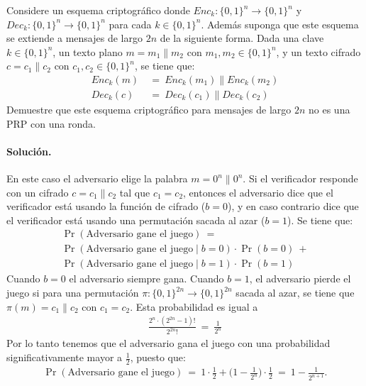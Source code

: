 Considere un esquema criptográfico donde $\textit{Enc}_k : \{0,1\}^n \to \{0,1\}^n$ y $\textit{Dec}_k :\{0,1\}^n \to \{0,1\}^n$ para cada $k \in \{0,1\}^n$. Además suponga que este esquema se extiende a mensajes de largo $2n$ de la siguiente forma. Dada una clave $k \in \{0,1\}^n$, un texto plano $m = m_1 \| m_2$ con $m_1, m_2 \in \{0,1\}^n$, y un texto cifrado $c = c_1 \| c_2$ con $c_1, c_2 \in \{0,1\}^n$, se tiene que:
\begin{align*}
\textit{Enc}_k(m) \ &= \ \textit{Enc}_k(m_1) \| \textit{Enc}_k(m_2)\\
\textit{Dec}_k(c) \ &= \ \textit{Dec}_k(c_1) \| \textit{Dec}_k(c_2)
\end{align*}
Demuestre que este esquema criptográfico para mensajes de largo $2n$ no es una PRP con una ronda.

\paragraph{Solución.} En este caso el adversario elige la palabra $m = 0^n \| 0^n$. Si el verificador responde con un cifrado $c = c_1 \| c_2$ tal que $c_1 = c_2$, entonces el adversario dice que el verificador está usando la función de cifrado ($b=0$), y en caso contrario dice que el verificador está usando una permutación sacada al azar ($b=1$).
Se tiene que:
\begin{multline*}
\Pr(\text{Adversario gane el juego}) \ =\\ 
\Pr(\text{Adversario gane el juego} \mid b=0) \cdot \Pr(b=0) \ +\\
\Pr(\text{Adversario gane el juego} \mid b=1) \cdot \Pr(b=1)
\end{multline*}
Cuando $b = 0$ el adversario siempre gana. Cuando $b = 1$, el adversario pierde el juego si para una permutación $\pi : \{0,1\}^{2n} \to \{0,1\}^{2n}$ sacada al azar, se tiene que $\pi(m) = c_1 \| c_2$ con $c_1 = c_2$. Esta probabilidad es igual a
\begin{align*}
\frac{2^n \cdot (2^{2n}-1)!}{2^{2n}!} \ = \ \frac{1}{2^{n}}
\end{align*}
Por lo tanto tenemos que el adversario gana el juego con una probabilidad significativamente mayor a $\frac{1}{2}$, puesto que:
\begin{align*}
\Pr(\text{Adversario gane el juego}) \ = \ 1 \cdot \frac{1}{2} + \bigg(1 - \frac{1}{2^n}\bigg) \cdot \frac{1}{2} \ = \ 1 - \frac{1}{2^{n+1}}.
\end{align*}
